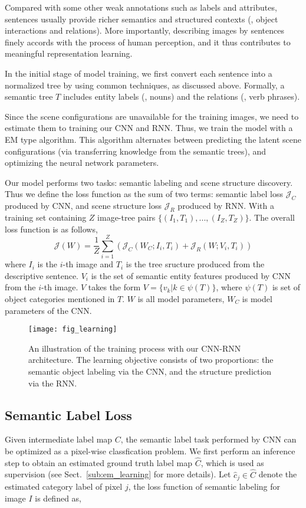 \documentclass[10pt,twocolumn,letterpaper]{article}
\begin{document}
Compared with some other weak annotations such as labels and attributes, sentences usually provide richer semantics and structured contexts (\eg, object interactions and relations). More importantly, describing images by sentences finely accords with the process of human perception, and it thus contributes to meaningful representation learning.

In the initial stage of model training, we first convert each sentence into a normalized tree by using common techniques, as discussed above. Formally, a semantic tree $T$ includes entity labels (\ie, nouns) and the relations (\ie, verb phrases).

Since the scene configurations are unavailable for the training images, we need to estimate them to training our CNN and RNN. Thus, we train the model with a EM type algorithm. This algorithm alternates between predicting the latent scene configurations (via transferring knowledge from the semantic trees), and optimizing the neural network parameters.

Our model performs two tasks: semantic labeling and scene structure discovery. Thus we define the loss function as the sum of two terms: semantic label loss $\mathcal{J}_{C}$ produced by CNN, and scene structure loss $\mathcal{J}_{R}$ produced by RNN. With a training set containing $Z$ image-tree pairs $\{(I_1,T_1),...,(I_Z,T_Z)\}$. The overall loss function is as follows,
\begin{equation}\label{eq_overallloss}
\mathcal{J}(W)  =  \frac{1}{Z} \sum_{i=1}^Z ( \mathcal{J}_{C}(W_C;I_i,T_i) + \mathcal{J}_{R}(W;V_i,T_i) )
\end{equation}
where $I_i$ is the $i$-th image and $T_i$ is the tree sructure produced from the descriptive sentence. $V_i$ is the set of semantic entity features produced by CNN from the $i$-th image. $V$ takes the form $V=\{v_k|k\in \psi(T)\}$, where $\psi(T)$ is set of object categories mentioned in $T$. $W$ is all model parameters, $W_C$ is model parameters of the CNN.


\begin{figure}[t]
\centering
\texttt{[image: fig\_learning]}
\caption{An illustration of the training process with our CNN-RNN architecture. The learning objective consists of two proportions: the semantic object labeling via the CNN, and the structure prediction via the RNN.}
\label{fig:learning}
\end{figure}

\subsection{Semantic Label Loss} \label{sub:cnn_loss}
Given intermediate label map $C$, the semantic label task performed by CNN can be optimized as a pixel-wise classfication problem. We first perform an inference step to obtain an estimated ground truth label map $\widehat{C}$, which is used as supervision (see Sect.~\ref{sub:em_learning} for more details). Let $\widehat{c}_j \in \widehat{C}$ denote the estimated category label of pixel $j$, the loss function of semantic labeling for image $I$ is defined as,
\end{document}
